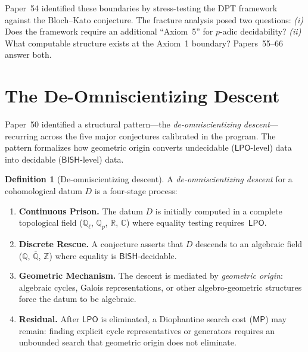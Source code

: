 \documentclass[11pt]{article}
\theoremstyle{plain}
\theoremstyle{definition}
\newtheorem{definition}[theorem]{Definition}
\theoremstyle{remark}
\newcommand{\Z}{\mathbb{Z}}
\newcommand{\Q}{\mathbb{Q}}
\newcommand{\R}{\mathbb{R}}
\newcommand{\C}{\mathbb{C}}
\newcommand{\Qbar}{\overline{\Q}}
\newcommand{\Qell}{\Q_\ell}
\newcommand{\Qp}{\Q_p}
\newcommand{\BISH}{\mathsf{BISH}}
\newcommand{\LPO}{\mathsf{LPO}}
\newcommand{\MP}{\mathsf{MP}}
\begin{document}
Paper~54 \cite{Paper54} identified these boundaries by
stress-testing the DPT framework against the Bloch--Kato
conjecture.  The fracture analysis posed two questions:
\emph{(i)} Does the framework require an additional ``Axiom~5''
for $p$-adic decidability?  \emph{(ii)} What computable structure
exists at the Axiom~1 boundary?  Papers~55--66 answer both.


\section{The De-Omniscientizing Descent}\label{sec:descent}

Paper~50 \cite{Paper50} identified a structural pattern---the
\emph{de-omniscientizing descent}---recurring across the five
major conjectures calibrated in the program.  The pattern
formalizes how geometric origin converts undecidable
($\LPO$-level) data into decidable ($\BISH$-level) data.

\begin{definition}[De-omniscientizing descent]\label{def:descent}
A \emph{de-omniscientizing descent} for a cohomological datum
$D$ is a four-stage process:
\begin{enumerate}
\item \textbf{Continuous Prison.}  The datum $D$ is initially
  computed in a complete topological field
  ($\Qell$, $\Qp$, $\R$, $\C$) where equality testing
  requires~$\LPO$.
\item \textbf{Discrete Rescue.}  A conjecture asserts that $D$
  descends to an algebraic field ($\Q$, $\Qbar$, $\Z$) where
  equality is $\BISH$-decidable.
\item \textbf{Geometric Mechanism.}  The descent is mediated by
  \emph{geometric origin}: algebraic cycles, Galois
  representations, or other algebro-geometric structures force
  the datum to be algebraic.
\item \textbf{Residual.}  After $\LPO$ is eliminated, a
  Diophantine search cost ($\MP$) may remain: finding explicit
  cycle representatives or generators requires an unbounded
  search that geometric origin does not eliminate.
\end{enumerate}
\end{definition}
\end{document}
